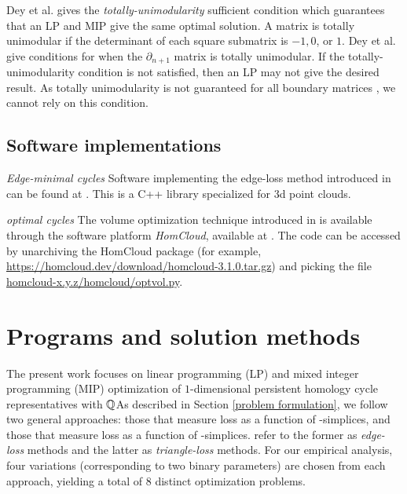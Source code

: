 Dey et al. \cite{dey2011optimal} gives the \textit{totally-unimodularity} sufficient condition which guarantees that an LP and MIP give the same optimal solution. A matrix is totally unimodular if the determinant of each square submatrix is $-1, 0$, or $1$. Dey et al. \cite{dey2011optimal} give conditions for when the $\partial_{n+1}$ matrix is totally unimodular. If the totally-unimodularity condition is not satisfied, then an LP may not give the desired result. As totally unimodularity is not guaranteed for all boundary matrices \cite{henselman2014combinatorial}, we cannot rely on this condition. 

\subsection{Software implementations}
\label{sec:existingimplementations}

\emph{Edge-minimal cycles}  Software implementing the edge-loss method introduced in \cite{Escolar2016} can be found at \cite{OptiPersLP}.  This is a C++ library specialized for 3d point clouds.


\emph{\DIFdelbegin {}\DIFdelend \DIFaddbegin {}\DIFaddend optimal cycles} The volume optimization technique introduced in \cite{Obayashi2018} is available through the software platform \emph{HomCloud}, available at  \cite{homcloud}.  The code can be accessed by unarchiving the HomCloud package  (for example,
\url{https://homcloud.dev/download/homcloud-3.1.0.tar.gz}) and picking the
file \url{homcloud-x.y.z/homcloud/optvol.py}.
\DIFaddbegin 






\DIFaddend \section{Programs and solution methods}\label{methodsProblems}
\label{sec:programsandmethods}

The present work focuses on linear  programming (LP) and mixed integer programming (MIP) optimization of $1$-dimensional persistent homology cycle representatives with $\mathbb{Q}$\DIFdelbegin {}\DIFdelend \DIFaddbegin {}\DIFaddend As described in Section \ref{problem formulation}, we follow two general approaches: those that measure loss as a function of \DIFdelbegin {}\DIFdelend \DIFaddbegin {}\DIFaddend -simplices, and those that measure loss as a function of \DIFdelbegin {}\DIFdelend \DIFaddbegin {}\DIFaddend -simplices.  \DIFdelbegin {}\DIFdelend \DIFaddbegin {}\DIFaddend refer to the former as \emph{edge-loss} methods and the latter as \emph{triangle-loss} methods.  
For our empirical analysis, four variations (corresponding to two binary parameters) are chosen from each approach, yielding a total of 8 distinct optimization problems. 


